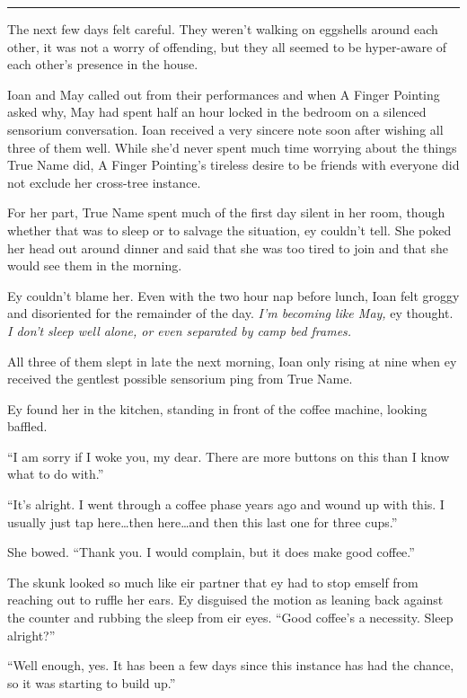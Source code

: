 \begin{center}\rule{0.5\linewidth}{0.5pt}\end{center}

The next few days felt careful. They weren't walking on eggshells around each other, it was not a worry of offending, but they all seemed to be hyper-aware of each other's presence in the house.

Ioan and May called out from their performances and when A Finger Pointing asked why, May had spent half an hour locked in the bedroom on a silenced sensorium conversation. Ioan received a very sincere note soon after wishing all three of them well. While she'd never spent much time worrying about the things True Name did, A Finger Pointing's tireless desire to be friends with everyone did not exclude her cross-tree instance.

For her part, True Name spent much of the first day silent in her room, though whether that was to sleep or to salvage the situation, ey couldn't tell. She poked her head out around dinner and said that she was too tired to join and that she would see them in the morning.

Ey couldn't blame her. Even with the two hour nap before lunch, Ioan felt groggy and disoriented for the remainder of the day. \emph{I'm becoming like May,} ey thought. \emph{I don't sleep well alone, or even separated by camp bed frames.}

All three of them slept in late the next morning, Ioan only rising at nine when ey received the gentlest possible sensorium ping from True Name.

Ey found her in the kitchen, standing in front of the coffee machine, looking baffled.

``I am sorry if I woke you, my dear. There are more buttons on this than I know what to do with.''

``It's alright. I went through a coffee phase years ago and wound up with this. I usually just tap here\ldots then here\ldots and then this last one for three cups.''

She bowed. ``Thank you. I would complain, but it does make good coffee.''

The skunk looked so much like eir partner that ey had to stop emself from reaching out to ruffle her ears. Ey disguised the motion as leaning back against the counter and rubbing the sleep from eir eyes. ``Good coffee's a necessity. Sleep alright?''

``Well enough, yes. It has been a few days since this instance has had the chance, so it was starting to build up.''

